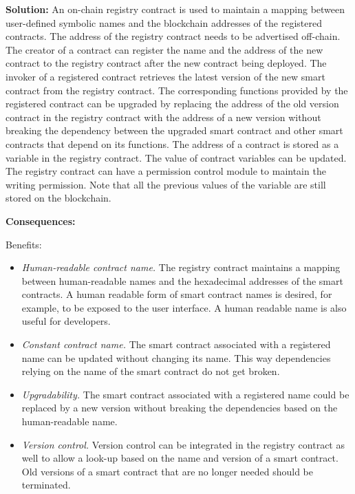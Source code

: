 \vspace{0.5em}\noindent \textbf{Solution:} 
An on-chain registry contract is used to maintain a mapping between user-defined symbolic names and the blockchain addresses of the registered contracts. The address of the registry contract needs to be advertised off-chain. The creator of a contract can register the name and the address of the new contract to the registry contract after the new contract being deployed. The invoker of a registered contract retrieves the latest version of the new smart contract from the registry contract. The corresponding functions provided by the registered contract can be upgraded by replacing the address of the old version contract in the registry contract with the address of a new version without breaking the dependency between the upgraded smart contract and other smart contracts that depend on its functions. The address of a contract is stored as a variable in the registry contract. The value of contract variables can be updated. The registry contract can have a permission control module to maintain the writing permission. Note that all the previous values of the variable are still stored on the blockchain. 

\vspace{0.5em}\noindent \textbf{Consequences:} 

Benefits:
\begin{itemize}
  \item \textit{Human-readable contract name.} The registry contract maintains a mapping between human-readable names and the hexadecimal addresses of the smart contracts. A human readable form of smart contract names is desired, for example, to be exposed to the user interface. A human readable name is also useful for developers.
  \item \textit{Constant contract name.} The smart contract associated with a registered name can be updated without changing its name. This way dependencies relying on the name of the smart contract do not get broken.
  \item \textit{Upgradability.} The smart contract associated with a registered name could be replaced by a new version without breaking the dependencies based on the human-readable name. 
  \item \textit{Version control.} Version control can be integrated in the registry contract as well to allow a look-up based on the name and version of a smart contract. Old versions of a smart contract that are no longer needed should be terminated. 
\end{itemize}

